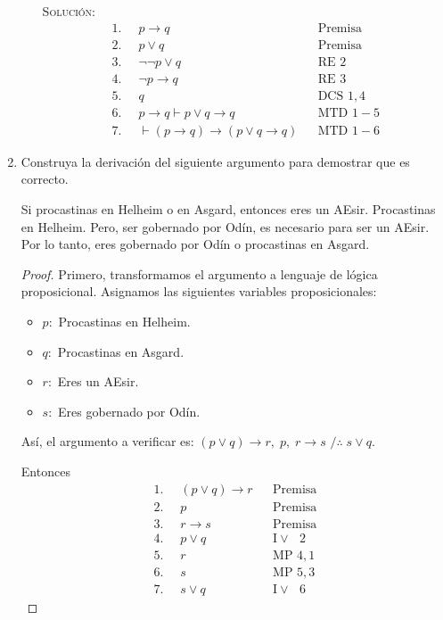 \documentclass[letterpaper,11pt]{article}
\begin{document}
\begin{enumerate}
\begin{itemize}
        \textsc{Solución:}
        \begin{align*}
            1.& \; \; p → q
            && \text{Premisa} \\
            2.& \; \; p \lor q
            && \text{Premisa} \\
            3.& \; \; \neg \neg p \lor q
            && \text{RE $2$} \\ 
            4.& \; \; \neg p → q
            && \text{RE $3$} \\ 
            5.& \; \; q
            && \text{DCS $1, 4$} \\ 
            6.& \; \; p→ q \vdash p \lor q → q
            && \text{MTD $1 - 5$} \\ 
            7.& \; \; \vdash (p → q) → (p \lor q → q)
            && \text{MTD $1 - 6$}
        \end{align*}
    \end{itemize}

    \item Construya la derivación del siguiente argumento para demostrar que es 
    correcto.

    Si procastinas en Helheim o en Asgard, entonces eres un AEsir. Procastinas 
    en Helheim. Pero, ser gobernado por Odín, es necesario para ser un AEsir. 
    Por lo tanto, eres gobernado por Odín o procastinas en Asgard.

    \begin{proof}
        Primero, transformamos el argumento a lenguaje de lógica proposicional.
        Asignamos las siguientes variables proposicionales:

        \begin{itemize}
            \item $p:$ Procastinas en Helheim.
            \item $q:$ Procastinas en Asgard.
            \item $r:$ Eres un AEsir.
            \item $s:$ Eres gobernado por Odín.
        \end{itemize}

        Así, el argumento a verificar es: $(p \lor q) → r, \; p, \; r → s$
        $/∴ \; s \lor q$. 

        Entonces
        \begin{align*}
            1.& \; \; (p \lor q) → r
            && \text{Premisa} \\ 
            2.& \; \; p
            && \text{Premisa} \\
            3.& \; \; r → s
            && \text{Premisa} \\ 
            4.& \; \; p \lor q
            && \text{I$\lor$ $2$} \\ 
            5.& \; \; r
            && \text{MP $4, 1$} \\ 
            6.& \; \; s
            && \text{MP $5, 3$} \\ 
            7.& \; \; s \lor q
            && \text{I$\lor$ $6$}
        \end{align*}


\end{proof}
\end{enumerate}
\end{document}
